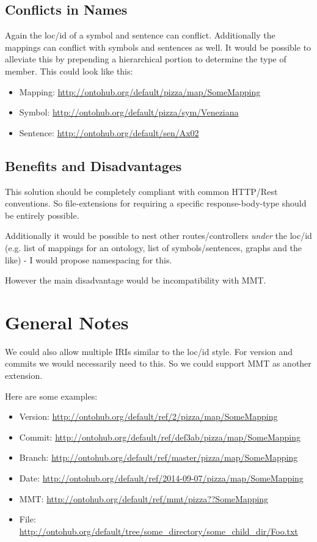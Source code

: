 \documentclass[a4paper,11pt,DIV=25]{scrartcl}
\begin{document}
\subsection{Conflicts in Names}

Again the loc/id of a symbol and sentence can conflict. Additionally the
mappings can conflict with symbols and sentences as well. It would be possible
to alleviate this by prepending a hierarchical portion to determine the type of
member. This could look like this:

\begin{itemize}
  \item Mapping: \url{http://ontohub.org/default/pizza/map/SomeMapping}
  \item Symbol: \url{http://ontohub.org/default/pizza/sym/Veneziana}
  \item Sentence: \url{http://ontohub.org/default/sen/Ax02}
\end{itemize}

\subsection{Benefits and Disadvantages}

This solution should be completely compliant with common HTTP/Rest conventions.
So file-extensions for requiring a specific response-body-type should be
entirely possible.

Additionally it would be possible to nest other routes/controllers
\textit{under} the loc/id (e.g. list of mappings for an ontology, list of
symbols/sentences, graphs and the like) - I would propose namespacing for this.

However the main disadvantage would be incompatibility with MMT.

\pagebreak

\section{General Notes}

We could also allow multiple IRIs similar to the loc/id style. For version and
commits we would necessarily need to this. So we could support MMT as another
extension.

Here are some examples:

\begin{itemize}
  \item Version: \url{http://ontohub.org/default/ref/2/pizza/map/SomeMapping}
  \item Commit: \url{http://ontohub.org/default/ref/def3ab/pizza/map/SomeMapping}
  \item Branch: \url{http://ontohub.org/default/ref/master/pizza/map/SomeMapping}
  \item Date: \url{http://ontohub.org/default/ref/2014-09-07/pizza/map/SomeMapping}
  \item MMT: \url{http://ontohub.org/default/ref/mmt/pizza??SomeMapping}
  \item File: \url{http://ontohub.org/default/tree/some_directory/some_child_dir/Foo.txt}
\end{itemize}
\end{document}
